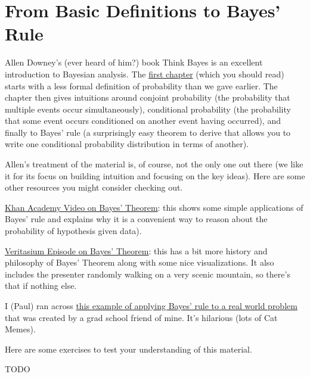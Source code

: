 \documentclass[assignment01_Solutions]{subfiles}
\begin{document}
\section{From Basic Definitions to Bayes' Rule}

\begin{externalresources}
Allen Downey's (ever heard of him?) book Think Bayes is an excellent introduction to Bayesian analysis.  The \href{http://www.greenteapress.com/thinkbayes/html/thinkbayes002.html}{first chapter} (which you should read) starts with a less formal definition of probability than we gave earlier.  The chapter then gives intuitions around conjoint probability (the probability that multiple events occur simultaneously), conditional probability (the probability that some event occurs conditioned on another event having occurred), and finally to Bayes' rule (a surprisingly easy theorem to derive that allows you to write one conditional probability distribution in terms of another).

Allen's treatment of the material is, of course, not the only one out there (we like it for its focus on building intuition and focusing on the key ideas).  Here are some other resources you might consider checking out.
\bi
\item \href{https://www.khanacademy.org/partner-content/wi-phi/wiphi-critical-thinking/wiphi-fundamentals/v/bayes-theorem}{Khan Academy Video on Bayes' Theorem}: this shows some simple applications of Bayes' rule and explains why it is a convenient way to reason about the probability of hypothesis given data).
\item \href{https://www.youtube.com/watch?v=R13BD8qKeTg}{Veritasium Episode on Bayes' Theorem}: this has a bit more history and philosophy of Bayes' Theorem along with some nice visualizations.  It also includes the presenter randomly walking on a very scenic mountain, so there's that if nothing else.
\item I (Paul) ran across \href{youtube.com/watch?v=nvqXXlz-rx0}{this example of applying Bayes' rule to a real world problem} that was created by a grad school friend of mine.  It's hilarious (lots of Cat Memes).
\ei

\end{externalresources}

\begin{exercise}
Here are some exercises to test your understanding of this material.
\bes
\item TODO
\ees

\end{exercise}
\end{document}
